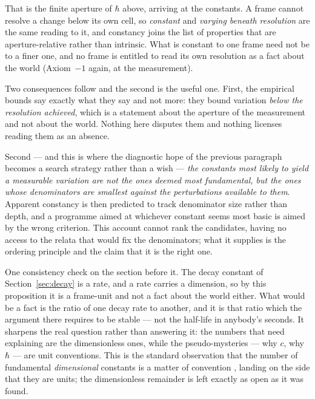 \documentclass[11pt,a4paper]{article}
\theoremstyle{remark}\newtheorem{remark}[definition]{Remark}
\begin{document}
That is the finite aperture of $\hbar$ above, arriving at the constants. A frame cannot resolve a
change below its own cell, so \emph{constant} and \emph{varying beneath resolution} are the same
reading to it, and constancy joins the list of properties that are aperture-relative rather than
intrinsic. What is constant to one frame need not be to a finer one, and no frame is entitled to read
its own resolution as a fact about the world (Axiom~$-1$ again, at the measurement).

Two consequences follow and the second is the useful one. First, the empirical bounds say exactly
what they say and not more: they bound variation \emph{below the resolution achieved}, which is a
statement about the aperture of the measurement and not about the world. Nothing here disputes them
and nothing licenses reading them as an absence.

Second --- and this is where the diagnostic hope of the previous paragraph becomes a search strategy
rather than a wish --- \emph{the constants most likely to yield a measurable variation are not the
ones deemed most fundamental, but the ones whose denominators are smallest against the perturbations
available to them}. Apparent constancy is then predicted to track denominator size rather than
depth, and a programme aimed at whichever constant seems most basic is aimed by the wrong criterion.
This account cannot rank the candidates, having no access to the relata that would fix the
denominators; what it supplies is the ordering principle and the claim that it is the right one.

One consistency check on the section before it. The decay constant of
Section~\ref{sec:decay} is a rate, and a rate carries a dimension, so by this proposition it is a
frame-unit and not a fact about the world either. What would be a fact is the ratio of one decay rate
to another, and it is that ratio which the argument there requires to be stable --- not the
half-life in anybody's seconds.
It sharpens the real question rather than answering it: the numbers that need
explaining are the dimensionless ones, while the pseudo-mysteries --- why $c$,
why $\hbar$ --- are unit conventions. This is the standard observation that the
number of fundamental \emph{dimensional} constants is a matter of convention
\citep{duff2002trialogue}, landing on the side that they are units; the dimensionless
remainder is left exactly as open as it was found.
\end{document}
